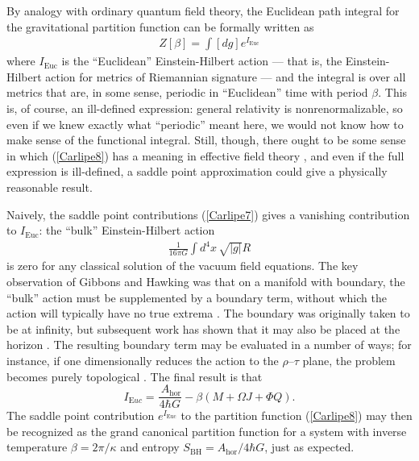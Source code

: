 \documentclass[12pt]{article}
\begin{document}
By analogy with ordinary quantum field theory,
the Euclidean path integral for the gravitational partition function can 
be formally written as
\begin{align}
Z[\beta] = \int [dg] e^{I_{\scriptscriptstyle\mathrm{Euc}}}
\label{Carlipe8}
\end{align}
where $I_{\scriptscriptstyle\mathrm{Euc}}$ is the ``Euclidean'' 
Einstein-Hilbert action --- that is, the Einstein-Hilbert action for
metrics of Riemannian signature --- and the integral is over all
metrics that are, in some sense, periodic in ``Euclidean'' 
time with period $\beta$.  This is, of course, an ill-defined expression: 
general relativity is nonrenormalizable, so even if we knew exactly what 
``periodic'' meant here, we would not know how to make sense of the 
functional integral.  
Still, though, there ought to be some sense in which (\ref{Carlipe8})  
has a meaning in effective field theory \cite{Burgess}, and even if the
full expression is ill-defined, a saddle point approximation could
give a physically reasonable result. 

Naively, the saddle point contributions (\ref{Carlipe7}) 
gives a vanishing contribution to
$I_{\scriptscriptstyle\mathrm{Euc}}$: the ``bulk'' Einstein-Hilbert action
\begin{align*}
\frac{1}{16\pi G}\int d^4x\,\sqrt{|g|}R
\end{align*}
is zero for any classical solution of the vacuum field equations.  The  
key observation of Gibbons and Hawking \cite{GibHawk} was that on
a manifold with boundary, the ``bulk'' action must be supplemented 
by a boundary term, without which the action will  typically have no true
extrema \cite{Regge}.   The boundary was originally taken to be
at infinity, but subsequent work has shown that it may also be
placed at the horizon \cite{BTZa,Teitelboim,HawkingHorowitz}.  
The resulting boundary term may be evaluated in a number of ways;
for instance, if one dimensionally reduces the action to the 
$\rho$--$\tau$ plane, the problem becomes purely topological 
\cite{BTZa}.  The final result is that
\begin{equation}
I_{\scriptscriptstyle\mathrm Euc} 
 = \frac{\ A_{\mathrm{\scriptstyle hor}}}{4\hbar G}
 - \beta(M + \Omega J + \Phi Q) .
\label{Carlipe9}
\end{equation}
The saddle point contribution $e^{I_{\scriptscriptstyle\mathrm{Euc}}}$ 
to the partition function (\ref{Carlipe8}) may then be recognized as the 
grand canonical partition function for a system with inverse temperature 
$\beta = 2\pi/\kappa$ and entropy $S_{\scriptscriptstyle\mathrm{BH}}%
=  A_{\mathrm{\scriptstyle hor}}/4\hbar G$, just as expected.  
\end{document}
